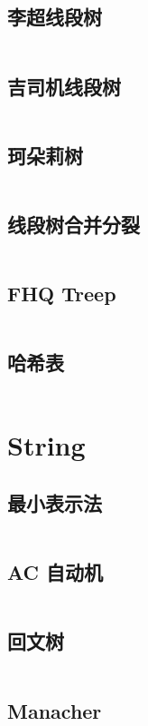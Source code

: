 \documentclass[titlepage, a4paper]{article}
\begin{document}
\begin{multicols}{2}
\begin{spacing}{0.6}
				\subsection{李超线段树}
					\inputminted{cpp}{src/DataStructure/li-chao-tree.cpp}
				\subsection{吉司机线段树}
					\inputminted{cpp}{src/DataStructure/seg-tree.cpp}
				\subsection{珂朵莉树}
					\inputminted{cpp}{src/DataStructure/ODT.cpp}
				\subsection{线段树合并分裂}
					\inputminted{cpp}{src/DataStructure/seg.cpp}					
				\subsection{FHQ Treep}
					\inputminted{cpp}{src/DataStructure/fhq-treap.cpp}
				\subsection{哈希表}
					\inputminted{cpp}{src/DataStructure/hashmap.cpp}

			\section{String}
				\subsection{最小表示法}
					\inputminted{cpp}{src/String/最小表示法.cpp}
				\subsection{AC 自动机}
					\inputminted{cpp}{src/String/ACAM.cpp}
				\subsection{回文树}
					\inputminted{cpp}{src/String/PAM.cpp}
				\subsection{Manacher}
					\inputminted{cpp}{src/String/Manacher.cpp}

\end{spacing}
\end{multicols}
\end{document}
